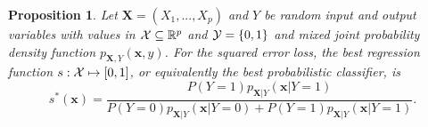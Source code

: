 \documentclass[12pt]{article}
\numberwithin{equation}{section}
\theoremstyle{plain}
\newtheorem{proposition}[theorem]{Proposition}
\begin{document}

\begin{proposition} \label{thm:best-classifier}
Let $\mathbf{X} = (X_1, ..., X_p)$ and $Y$ be random input and output variables
with values in ${\cal X} \subseteq \mathbb{R}^p$
and ${\cal Y} = \{0, 1\}$ and mixed joint probability density  function
$p_{\mathbf{X},Y}(\mathbf{x}, y)$. For the squared error loss, the best
regression function $s : {\cal X} \mapsto [0, 1]$, or equivalently the best
probabilistic classifier, is
\begin{equation}
s^*(\mathbf{x}) = \frac{P(Y=1) p_{\mathbf{X}|Y}(\mathbf{x}|Y=1)}{P(Y=0) p_{\mathbf{X}|Y}(\mathbf{x} | Y=0) + P(Y=1) p_{\mathbf{X}|Y}(\mathbf{x} | Y=1)}.
\end{equation}
\end{proposition}
\end{document}
